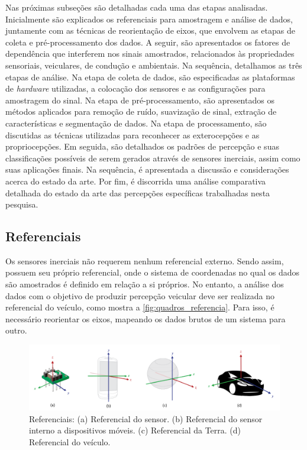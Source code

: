 Nas próximas subseções são detalhadas cada uma das etapas analisadas. Inicialmente são explicados os referenciais para amostragem e análise de dados, juntamente com as técnicas de reorientação de eixos, que envolvem as etapas de coleta e pré-processamento dos dados. A seguir, são apresentados os fatores de dependência que interferem nos sinais amostrados, relacionados às propriedades sensoriais, veiculares, de condução e ambientais. Na sequência, detalhamos as três etapas de análise. Na etapa de coleta de dados, são especificadas as plataformas de \textit{hardware} utilizadas, a colocação dos sensores e as configurações para amostragem do sinal. Na etapa de pré-processamento, são apresentados os métodos aplicados para remoção de ruído, suavização de sinal, extração de características e segmentação de dados. Na etapa de processamento, são discutidas as técnicas utilizadas para reconhecer as exterocepções e as propriocepções. Em seguida, são detalhados os padrões de percepção e suas classificações possíveis de serem gerados através de sensores inerciais, assim como suas aplicações finais. Na sequência, é apresentada a discussão e considerações acerca do estado da arte. Por fim, é discorrida uma análise comparativa detalhada do estado da arte das percepções específicas trabalhadas nesta pesquisa.

\subsection{Referenciais}

Os sensores inerciais não requerem nenhum referencial externo. Sendo assim, possuem seu próprio referencial, onde o sistema de coordenadas no qual os dados são amostrados é definido em relação a si próprios. No entanto, a análise dos dados com o objetivo de produzir percepção veicular deve ser realizada no referencial do veículo, como mostra a \autoref{fig:quadros_referencia}. Para isso, é necessário reorientar os eixos, mapeando os dados brutos de um sistema para outro.

\begin{figure}[h]
  \centering
  \caption{Referenciais: (a) Referencial do sensor. (b) Referencial do sensor interno a dispositivos móveis. (c) Referencial da Terra. (d) Referencial do veículo.}
   \label{fig:quadros_referencia}
   \includegraphics[width=1\textwidth]{figuras/fig_3.png}
\end{figure}

